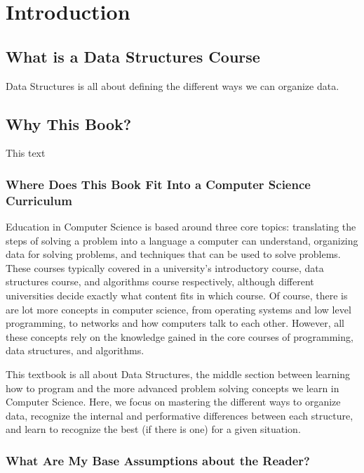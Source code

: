 
\chapter{Introduction}

\section{What is a Data Structures Course}
Data Structures is all about defining the different ways we can organize data.


\section{Why This Book?}

This text


\subsection{Where Does This Book Fit Into a Computer Science Curriculum }

Education in Computer Science is based around three core topics: translating the steps of solving a problem into a language a computer can understand, organizing data for solving problems, and techniques that can be used to solve problems. %
These courses typically covered in a university's introductory course, data structures course, and algorithms course respectively, although different universities decide exactly what content fits in which course.
Of course, there is are lot more concepts in computer science, from operating systems and low level programming,  to networks and how computers talk to each other. However, all these concepts rely on the knowledge gained in the core courses of programming, data structures, and algorithms.



This textbook is all about Data Structures, the middle section between learning how to program and the more advanced problem solving concepts we learn in Computer Science. 
Here, we focus on mastering the different ways to organize data, recognize the internal and performative differences between each structure, and learn to recognize the best (if there is one) for a given situation.


\subsection{What Are My Base Assumptions about the Reader?}

